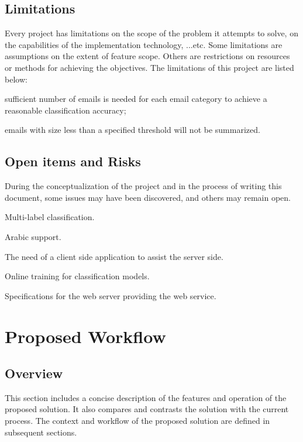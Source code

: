 \documentclass[a4paper,10pt]{article}
\newenvironment{my_itemize}
{\begin{itemize}
  \setlength{\itemsep}{0cm}
  \setlength{\parskip}{0cm}}
{\end{itemize}}
\begin{document}
\subsection{Limitations}
Every project has limitations on the scope of the problem it attempts to solve, 
on the capabilities of the implementation technology, ...etc. Some limitations 
are assumptions on the extent of feature scope. Others are restrictions on resources 
or methods for achieving the objectives. The limitations of this project are listed below:

\begin{my_itemize}
  \item sufficient number of emails is needed for each email category to achieve a reasonable classification accuracy;
  \item emails with size less than a specified threshold will not be summarized.
\end{my_itemize}

\subsection{Open items and Risks}
During the conceptualization of the project and in the process of writing this document, 
some issues may have been discovered, and others may remain open.
\begin{my_itemize}
  \item Multi-label classification.
  \item Arabic support.
  \item The need of a client side application to assist the server side.
  \item Online training for classification models.
  \item Specifications for the web server providing the web service.
\end{my_itemize}


\section{Proposed Workflow}
\subsection{Overview}
This section includes a concise description of the features and operation of the 
proposed solution. It also compares and contrasts the solution with the current 
process. The context and workflow of the proposed solution are defined in subsequent sections.
\end{document}
